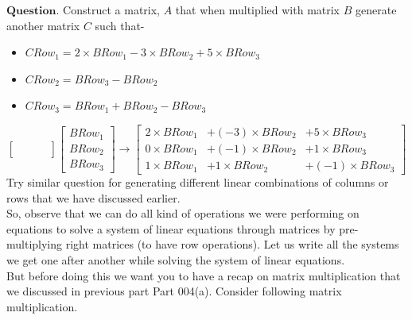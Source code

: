 \documentclass{article}
\begin{document}
$\boldsymbol{Question}$. Construct a matrix, $A$ that when multiplied with matrix $B$ generate another matrix $C$ such that-
\begin{itemize}
    \item $CRow_1 = 2\times BRow_1 - 3\times BRow_2 + 5\times BRow_3$
    \item $CRow_2 =  BRow_3 - BRow_2$
    \item $CRow_3 = BRow_1 + BRow_2 - BRow_3$
\end{itemize}
\[
    \begin{bmatrix}
        & & & \\
        & & & \\
        & & &
    \end{bmatrix} \begin{bmatrix}
                        BRow_1\\
                        BRow_2\\
                        BRow_3
                  \end{bmatrix} \longrightarrow \begin{bmatrix}
                                    2\times BRow_1 &+ (-3)\times BRow_2 &+ 5\times BRow_3 \\
                                    0\times BRow_1 &+ (-1)\times BRow_2 &+ 1\times BRow_3\\
                                    
                                    1\times BRow_1 &+ 1\times BRow_2 &+(-1)\times  BRow_3
                                \end{bmatrix}
\]
Try similar question for generating different linear combinations of columns or rows that we have discussed earlier.\\
So, observe that we can do all kind of operations we were performing on equations to solve a system of linear equations through matrices by pre-multiplying right matrices (to have row operations). Let us write all the systems we get one after another while solving the system of linear equations.\\

But before doing this we want you to have a recap on matrix multiplication that we discussed in previous part Part 004(a). Consider following matrix multiplication.
\end{document}

